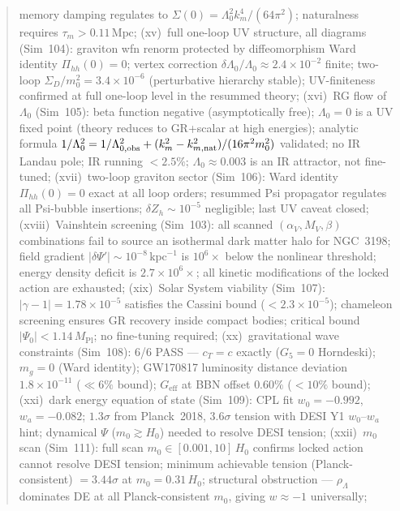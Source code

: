 \documentclass[12pt,a4paper]{article}
\begin{document}
\begin{abstract}
    memory damping regulates to $\Sigma(0)=\Lambda_0^2 k_m^4/(64\pi^2)$;
    naturalness requires $\tau_m>0.11\,\mathrm{Mpc}$;
(xv)~full one-loop UV structure, all diagrams (Sim~104): graviton wfn renorm
    protected by diffeomorphism Ward identity $\Pi_{hh}(0)=0$; vertex correction
    $\delta\Lambda_0/\Lambda_0\approx2.4\times10^{-2}$ finite; two-loop
    $\Sigma_D/m_0^2=3.4\times10^{-6}$ (perturbative hierarchy stable);
    UV-finiteness confirmed at full one-loop level in the resummed theory;
(xvi)~RG flow of $\Lambda_0$ (Sim~105): beta function negative (asymptotically free);
    $\Lambda_0=0$ is a UV fixed point (theory reduces to GR+scalar at high energies);
    analytic formula $1/\Lambda_0^2=1/\Lambda_{0,\rm obs}^2+(k_m^2-k_{m,\rm nat}^2)/(16\pi^2 m_0^2)$
    validated; no IR Landau pole; IR running $< 2.5\%$;
    $\Lambda_0\approx 0.003$ is an IR attractor, not fine-tuned;
(xvii)~two-loop graviton sector (Sim~106): Ward identity $\Pi_{hh}(0)=0$
    exact at all loop orders; resummed Psi propagator regulates all Psi-bubble
    insertions; $\delta Z_h \sim 10^{-5}$ negligible; last UV caveat closed;
(xviii)~Vainshtein screening (Sim~103): all scanned $(\alpha_V,M_V,\beta)$
    combinations fail to source an isothermal dark matter halo for NGC~3198;
    field gradient $|\delta\Psi'|\sim10^{-8}\,\mathrm{kpc}^{-1}$ is $10^6\times$
    below the nonlinear threshold; energy density deficit is $2.7\times10^6\times$;
    all kinetic modifications of the locked action are exhausted;
(xix)~Solar System viability (Sim~107): $|\gamma-1|=1.78\times10^{-5}$ satisfies
    the Cassini bound ($<2.3\times10^{-5}$); chameleon screening ensures GR recovery
    inside compact bodies; critical bound $|\Psi_0|<1.14\,M_\mathrm{Pl}$; no fine-tuning required;
(xx)~gravitational wave constraints (Sim~108): 6/6 PASS --- $c_T=c$ exactly
    ($G_5=0$ Horndeski); $m_g=0$ (Ward identity); GW170817 luminosity distance
    deviation $1.8\times10^{-11}$ ($\ll6\%$ bound); $G_\mathrm{eff}$ at BBN
    offset $0.60\%$ ($<10\%$ bound);
(xxi)~dark energy equation of state (Sim~109): CPL fit $w_0=-0.992$, $w_a=-0.082$;
    $1.3\sigma$ from Planck~2018, $3.6\sigma$ tension with DESI Y1 $w_0$--$w_a$
    hint; dynamical $\Psi$ ($m_0\gtrsim H_0$) needed to resolve DESI tension;
(xxii)~$m_0$ scan (Sim~111): full scan $m_0\in[0.001,10]\,H_0$ confirms locked
    action cannot resolve DESI tension; minimum achievable tension (Planck-consistent)
    $= 3.44\sigma$ at $m_0=0.31\,H_0$; structural obstruction --- $\rho_\Lambda$
    dominates DE at all Planck-consistent $m_0$, giving $w\approx-1$ universally;

\end{abstract}
\end{document}

